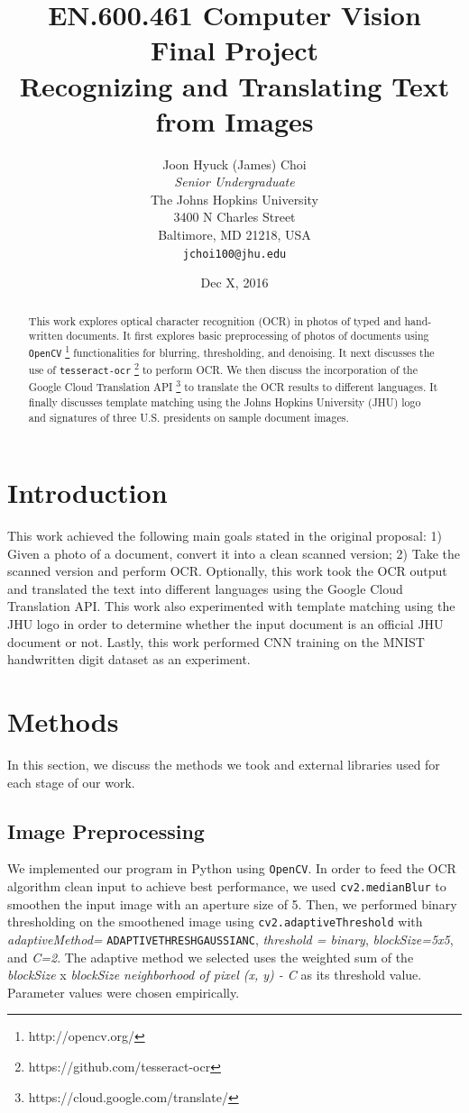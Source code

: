 \documentclass[11pt,letterpaper]{article}
\title{EN.600.461 Computer Vision\\Final Project\\Recognizing and Translating Text from Images}
\author{Joon Hyuck (James) Choi\\
  \textit{Senior Undergraduate}\\
  The Johns Hopkins University\\
  3400 N Charles Street\\
  Baltimore, MD 21218, USA\\
  {\tt jchoi100@jhu.edu}}
\date{Dec X, 2016}
\begin{document}
\maketitle
\begin{abstract}
  This work explores optical character recognition (OCR) in photos of typed and hand-written documents. It first explores basic preprocessing of photos of documents using {\tt OpenCV} \footnote{http://opencv.org/} functionalities for blurring, thresholding, and denoising. It next discusses the use of {\tt tesseract-ocr} \footnote{https://github.com/tesseract-ocr} to perform OCR. We then discuss the incorporation of the Google Cloud Translation API \footnote{https://cloud.google.com/translate/} to translate the OCR results to different languages. It finally discusses template matching using the Johns Hopkins University (JHU) logo and signatures of three U.S. presidents on sample document images. 
\end{abstract}

\section{Introduction}

This work achieved the following main goals stated in the original proposal: 1) Given a photo of a document, convert it into a clean scanned version; 2) Take the scanned version and perform OCR. Optionally, this work took the OCR output and translated the text into different languages using the Google Cloud Translation API. This work also experimented with template matching using the JHU logo in order to determine whether the input document is an official JHU document or not. Lastly, this work performed CNN training on the MNIST handwritten digit dataset as an experiment.

\section{Methods}

In this section, we discuss the methods we took and external libraries used for each stage of our work.

\subsection{Image Preprocessing}

We implemented our program in Python using {\tt OpenCV}. In order to feed the OCR algorithm clean input to achieve best performance, we used {\tt cv2.medianBlur} to smoothen the input image with an aperture size of 5. Then, we performed binary thresholding on the smoothened image using {\tt cv2.adaptiveThreshold} with \textit{adaptiveMethod=} {\tt ADAPTIVE\textunderscore THRESH\textunderscore GAUSSIAN\textunderscore C}, \textit{threshold = binary}, \textit{blockSize=5x5}, and \textit{C=2}. The adaptive method we selected uses the weighted sum of the \textit{blockSize} x \textit{blockSize neighborhood of pixel (x, y) - C} as its threshold value. Parameter values were chosen empirically.
\end{document}
